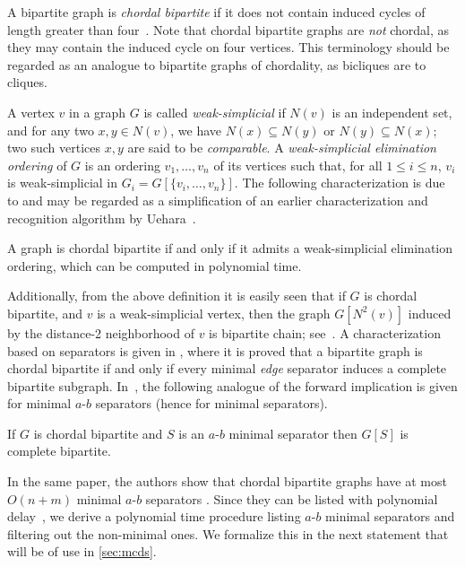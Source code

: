A bipartite graph is \emph{chordal bipartite} if it does not contain induced cycles of length greater than four~\cite{golumbic2004algorithmic}.
Note that chordal bipartite graphs are \emph{not} chordal, as they may contain the induced cycle on four vertices.
This terminology should be regarded as an analogue to bipartite graphs of chordality, as bicliques are to cliques.

A vertex $v$ in a graph $G$ is called \emph{weak-simplicial} if $N(v)$ is an independent set, and for any two $x,y\in N(v)$, we have $N(x)\subseteq N(y)$ or $N(y)\subseteq N(x)$; two such vertices $x,y$ are said to be \emph{comparable}.
A \emph{weak-simplicial elimination ordering} of $G$ is an ordering $v_1,\dots,v_n$ of its vertices such that, for all $1\leq i\leq n$, $v_i$ is weak-simplicial in $G_i = G\left[\{v_i, \dots,v_n\}\right]$.
%
The following characterization is due to \cite{kurita2019efficient} and may be regarded as a simplification of an earlier characterization and recognition algorithm by Uehara~\cite{uehara2002linear}. 

\begin{proposition}\label{prop:weak-seo}
    A graph is chordal bipartite if and only if it admits a weak-simplicial elimination ordering, which can be computed in polynomial time.
\end{proposition}

Additionally, from the above definition it is easily seen that if $G$ is chordal bipartite, and $v$ is a weak-simplicial vertex, then the graph $G[N^2(v)]$ induced by the distance-2 neighborhood of $v$ is bipartite chain; see~\cite[Lemma~3]{kurita2019efficient}.
A characterization based on separators is given in \cite{golumbic1978perfect}, where it is proved that a bipartite graph is chordal bipartite if and only if every minimal \emph{edge} separator induces a complete bipartite subgraph.
In~\cite{kloks2011feedback}, the following analogue of the forward implication is given for minimal $a$-$b$ separators (hence for minimal separators). 

\begin{proposition}\label{prop:chbip-vertex-sep}
    If $G$ is chordal bipartite and $S$ is an $a$-$b$ minimal separator then $G[S]$ is complete bipartite.
\end{proposition}

In the same paper, the authors show that chordal bipartite graphs have at most $O(n+m)$ minimal $a$-$b$ separators \cite{kloks2011feedback}.
Since they can be listed with polynomial delay~\cite{kloks1998listing}, we derive a polynomial time procedure listing $a$-$b$ minimal separators and filtering out the non-minimal ones.
We formalize this in the next statement that will be of use in \autoref{sec:mcds}.

